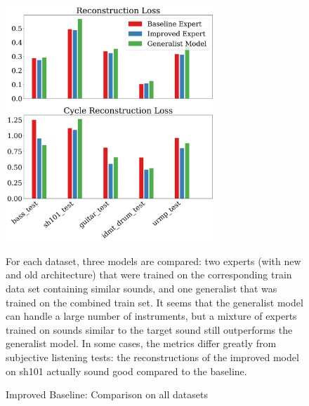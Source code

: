 \begin{figure}
    \centering
    \includegraphics[width=0.7\textwidth]{figures/all_datasets.png}
    \caption{Improved Baseline: Comparison on all datasets}
    \label{fig:multi-datasets}
    \small{For each dataset, three models are compared: two experts (with new and old architecture) that were trained on the corresponding train data set containing similar sounds, and one generalist that was trained on the combined train set. It seems that the generalist model can handle a large number of instruments, but a mixture of experts trained on sounds similar to the target sound still outperforms the generalist model. In some cases, the metrics differ greatly from subjective listening tests: the reconstructions of the improved model on sh101 actually sound good compared to the baseline.}
\end{figure}



